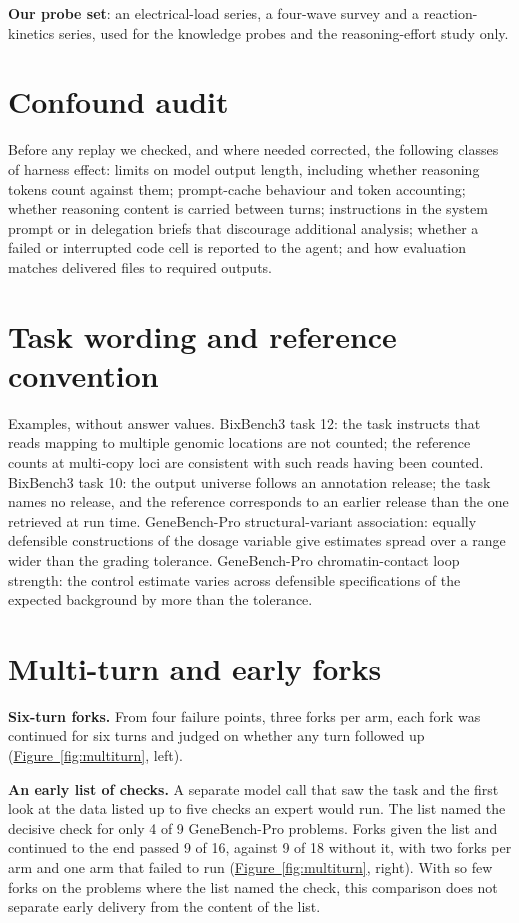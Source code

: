 \documentclass[10pt]{article}
\newcommand{\figref}[1]{\hyperref[#1]{Figure~\ref*{#1}}}
\begin{document}
\textbf{Our probe set}: an electrical-load series, a four-wave survey and a reaction-kinetics series, used for the knowledge probes and the
reasoning-effort study only.

\section{Confound audit}\label{app:confounds}
Before any replay we checked, and where needed corrected, the following classes of harness effect: limits on model output length, including whether reasoning
tokens count against them; prompt-cache behaviour and token accounting; whether reasoning content is carried between turns; instructions in the system prompt or
in delegation briefs that discourage additional analysis; whether a failed or interrupted code cell is reported to the agent; and how evaluation matches delivered
files to required outputs.

\section{Task wording and reference convention}\label{app:conventions}
Examples, without answer values. BixBench3 task 12: the task instructs that reads mapping to multiple genomic locations are not counted; the reference counts at
multi-copy loci are consistent with such reads having been counted. BixBench3 task 10: the output universe follows an annotation release; the task names no release,
and the reference corresponds to an earlier release than the one retrieved at run time. GeneBench-Pro structural-variant association: equally defensible constructions
of the dosage variable give estimates spread over a range wider than the grading tolerance. GeneBench-Pro chromatin-contact loop strength: the control estimate varies
across defensible specifications of the expected background by more than the tolerance.

\section{Multi-turn and early forks}\label{app:multiturn}
\textbf{Six-turn forks.} From four failure points, three forks per arm, each fork was continued for six turns and judged on whether any turn followed up
(\figref{fig:multiturn}, left).

\textbf{An early list of checks.} A separate model call that saw the task and the first look at the data listed up to five checks an expert would run. The list
named the decisive check for only 4 of 9 GeneBench-Pro problems. Forks given the list and continued to the end passed 9 of 16, against 9 of 18 without it, with two
forks per arm and one arm that failed to run (\figref{fig:multiturn}, right). With so few forks on the problems where the list named the check, this comparison does
not separate early delivery from the content of the list.
\end{document}
